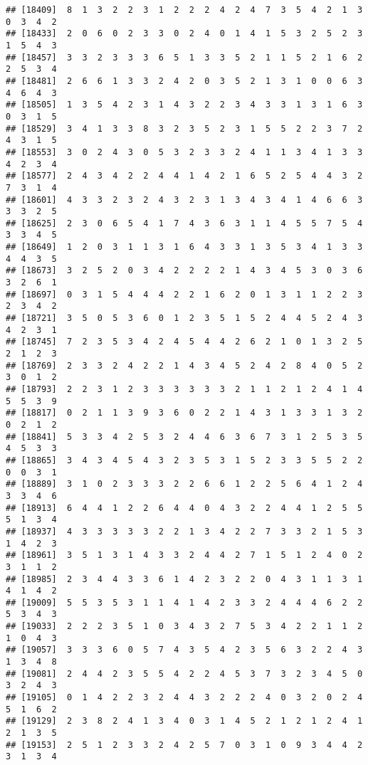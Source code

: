 \documentclass[
]{article}
\begin{document}
\begin{verbatim}
## [18409]  8  1  3  2  2  3  1  2  2  2  4  2  4  7  3  5  4  2  1  3  0  3  4  2
## [18433]  2  0  6  0  2  3  3  0  2  4  0  1  4  1  5  3  2  5  2  3  1  5  4  3
## [18457]  3  3  2  3  3  3  6  5  1  3  3  5  2  1  1  5  2  1  6  2  2  5  3  4
## [18481]  2  6  6  1  3  3  2  4  2  0  3  5  2  1  3  1  0  0  6  3  4  6  4  3
## [18505]  1  3  5  4  2  3  1  4  3  2  2  3  4  3  3  1  3  1  6  3  0  3  1  5
## [18529]  3  4  1  3  3  8  3  2  3  5  2  3  1  5  5  2  2  3  7  2  4  3  1  5
## [18553]  3  0  2  4  3  0  5  3  2  3  3  2  4  1  1  3  4  1  3  3  4  2  3  4
## [18577]  2  4  3  4  2  2  4  4  1  4  2  1  6  5  2  5  4  4  3  2  7  3  1  4
## [18601]  4  3  3  2  3  2  4  3  2  3  1  3  4  3  4  1  4  6  6  3  3  3  2  5
## [18625]  2  3  0  6  5  4  1  7  4  3  6  3  1  1  4  5  5  7  5  4  3  3  4  5
## [18649]  1  2  0  3  1  1  3  1  6  4  3  3  1  3  5  3  4  1  3  3  4  4  3  5
## [18673]  3  2  5  2  0  3  4  2  2  2  2  1  4  3  4  5  3  0  3  6  3  2  6  1
## [18697]  0  3  1  5  4  4  4  2  2  1  6  2  0  1  3  1  1  2  2  3  2  3  4  2
## [18721]  3  5  0  5  3  6  0  1  2  3  5  1  5  2  4  4  5  2  4  3  4  2  3  1
## [18745]  7  2  3  5  3  4  2  4  5  4  4  2  6  2  1  0  1  3  2  5  2  1  2  3
## [18769]  2  3  3  2  4  2  2  1  4  3  4  5  2  4  2  8  4  0  5  2  3  0  1  2
## [18793]  2  2  3  1  2  3  3  3  3  3  3  2  1  1  2  1  2  4  1  4  5  5  3  9
## [18817]  0  2  1  1  3  9  3  6  0  2  2  1  4  3  1  3  3  1  3  2  0  2  1  2
## [18841]  5  3  3  4  2  5  3  2  4  4  6  3  6  7  3  1  2  5  3  5  4  5  3  3
## [18865]  3  4  3  4  5  4  3  2  3  5  3  1  5  2  3  3  5  5  2  2  0  0  3  1
## [18889]  3  1  0  2  3  3  3  2  2  6  6  1  2  2  5  6  4  1  2  4  3  3  4  6
## [18913]  6  4  4  1  2  2  6  4  4  0  4  3  2  2  4  4  1  2  5  5  5  1  3  4
## [18937]  4  3  3  3  3  3  2  2  1  3  4  2  2  7  3  3  2  1  5  3  1  4  2  3
## [18961]  3  5  1  3  1  4  3  3  2  4  4  2  7  1  5  1  2  4  0  2  3  1  1  2
## [18985]  2  3  4  4  3  3  6  1  4  2  3  2  2  0  4  3  1  1  3  1  4  1  4  2
## [19009]  5  5  3  5  3  1  1  4  1  4  2  3  3  2  4  4  4  6  2  2  5  3  4  3
## [19033]  2  2  2  3  5  1  0  3  4  3  2  7  5  3  4  2  2  1  1  2  1  0  4  3
## [19057]  3  3  3  6  0  5  7  4  3  5  4  2  3  5  6  3  2  2  4  3  1  3  4  8
## [19081]  2  4  4  2  3  5  5  4  2  2  4  5  3  7  3  2  3  4  5  0  3  2  4  3
## [19105]  0  1  4  2  2  3  2  4  4  3  2  2  2  4  0  3  2  0  2  4  5  1  6  2
## [19129]  2  3  8  2  4  1  3  4  0  3  1  4  5  2  1  2  1  2  4  1  2  1  3  5
## [19153]  2  5  1  2  3  3  2  4  2  5  7  0  3  1  0  9  3  4  4  2  3  1  3  4

\end{verbatim}
\end{document}
